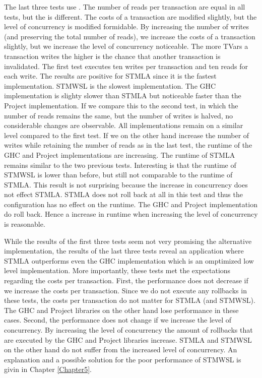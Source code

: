 The last three tests use . The number of reads per transaction are equal in all tests, but the 
 is different. The costs of a transaction are modified slightly, but the level of concurrency
is modified formidable. By increasing the number of writes (and preserving the total number of reads), we increase the costs of a transaction slightly, but we 
increase the level of concurrency noticeable. The more TVars a transaction writes the higher is the chance that another transaction is invalidated.
The first test executes ten writes
per transaction and ten reads for each write. The results are positive for STMLA since it is the fastest implementation.
STMWSL is the slowest implementation. The GHC implementation is slighty slower than STMLA but noticeable faster than the 
Project implementation. If we compare this to the second test, in which the number of reads remains the same, but the number of
writes is halved, no considerable changes are observable. All implementations remain on a similar level compared to the first
test. If we on the other hand increase the number of writes while retaining the number of reads as in the last test, the runtime of the
GHC and Project implementations are increasing. The runtime of STMLA remains similar to the two previous tests. 
Interesting is that the runtime of STMWSL is lower than before, but still not comparable to the runtime of STMLA.
This result is not surprising because the increase in concurrency does not effect STMLA. STMLA does not roll back at
all in this test and thus the configuration has no effect on the runtime. The GHC and Project implementation do
roll back. Hence a increase in runtime when increasing the level of concurrency is reasonable.

While the results of the first three tests seem not very promising the alternative implementation, the results
of the last three tests reveal an application where STMLA outperforms even the GHC implementation which is 
an omptimized low level  implementation. 
More importantly, these tests met the expectations regarding the costs per transaction. First,
the performance does not decrease if we increase the costs per transaction. Since we do not execute any rollbacks in these 
tests, the costs per transaction do not matter for STMLA (and STMWSL). The GHC and Project libraries on the other hand 
lose performance in these cases. Second, the performance does not change if we increase the level of concurrency. By increasing
the level of concurrency the amount of rollbacks that are executed by the GHC and Project libraries increase. STMLA and STMWSL
on the other hand do not suffer from the increased level of concurrency. 
An explanation and a possible solution for the poor performance of STMWSL is givin in Chapter \ref{Chapter5}.


